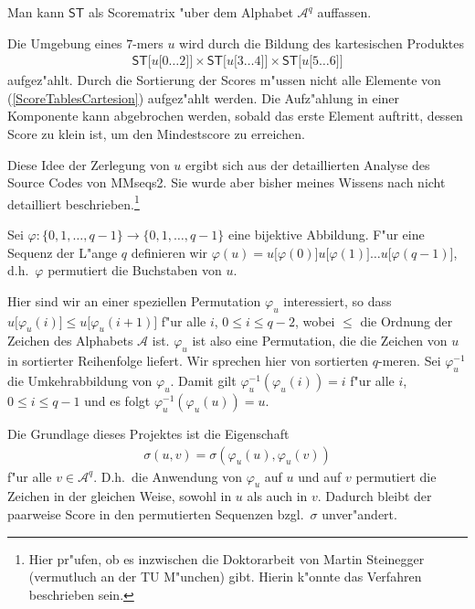 \documentclass[12pt,a4paper]{scrartcl}
\newcommand{\Substring}[3]{#1\lbrack #2\ldots#3\rbrack}
\newcommand{\Subchar}[2]{#1\lbrack #2\rbrack}
\newcommand{\Scoretablename}[0]{\mathsf{ST}}
\newcommand{\Scoretable}[1]{\Scoretablename\lbrack #1\rbrack}
\newcommand{\Permname}[1]{\varphi_{#1}}
\newcommand{\Perm}[2]{\Permname{#1}(#2)}
\newcommand{\Permnameinverse}[1]{\varphi_{#1}^{-1}}
\newcommand{\Perminverse}[2]{\Permnameinverse{#1}(#2)}
\newcommand{\Alpha}[0]{\mathcal{A}}
\begin{document}
Man kann \(\Scoretablename\) als Scorematrix "uber dem Alphabet \(\Alpha^{q}\)
auffassen.

Die Umgebung eines \(7\)-mers \(u\) wird durch die Bildung
des kartesischen Produktes
\begin{align}
\Scoretable{\Substring{u}{0}{2}}\times \Scoretable{\Substring{u}{3}{4}}\times
\Scoretable{\Substring{u}{5}{6}}\label{ScoreTablesCartesian}
\end{align}
aufgez"ahlt. Durch die Sortierung
der Scores m"ussen nicht alle Elemente von
(\ref{ScoreTablesCartesion})
aufgez"ahlt werden.
Die Aufz"ahlung in einer Komponente kann abgebrochen werden,
sobald das erste Element auftritt, dessen Score zu klein ist, um den
Mindestscore zu erreichen.

Diese Idee der Zerlegung von \(u\) ergibt sich aus
der detaillierten Analyse des Source Codes von MMseqs2. Sie wurde aber bisher
meines Wissens nach nicht detailliert beschrieben.\footnote{Hier pr"ufen, ob
es inzwischen die Doktorarbeit von Martin Steinegger (vermutluch an der
TU M"unchen) gibt. Hierin k"onnte das Verfahren beschrieben sein.}

Sei \(\varphi:\{0,1,\ldots,q-1\}\to \{0,1,\ldots,q-1\}\) eine bijektive
Abbildung. F"ur eine Sequenz der L"ange \(q\) definieren wir
\(\varphi(u)=\Subchar{u}{\varphi(0)}\Subchar{u}{\varphi(1)}\ldots\Subchar{u}{\varphi(q-1)}\), d.h.\ \(\varphi\) permutiert die Buchstaben von \(u\).

Hier sind wir an einer speziellen Permutation \(\Permname{u}\) interessiert,
so dass \(\Subchar{u}{\Perm{u}{i}}\leq\Subchar{u}{\Perm{u}{i+1}}\)
f"ur alle \(i\), \(0\leq i\leq q-2\), wobei \(\leq\) die Ordnung der Zeichen
des Alphabets \(\Alpha\) ist. \(\Permname{u}\) ist also eine Permutation, die
die Zeichen von \(u\) in sortierter Reihenfolge liefert. Wir sprechen hier
von sortierten \(q\)-meren.
Sei \(\Permnameinverse{u}\) die Umkehrabbildung von
\(\Permname{u}\). Damit gilt \(\Perminverse{u}{\Perm{u}{i}}=i\) f"ur alle \(i\), \(0\leq i\leq q-1\) und es
folgt \(\Perminverse{u}{\Perm{u}{u}}=u\).

Die Grundlage dieses Projektes ist die Eigenschaft
\begin{align}
\sigma(u,v)=\sigma(\Perm{u}{u},\Perm{u}{v})
\end{align}
f"ur alle \(v\in\Alpha^{q}\).
D.h.\ die Anwendung von \(\Permname{u}\) auf \(u\) und auf \(v\)
permutiert die Zeichen in der gleichen Weise, sowohl in \(u\) als auch
in \(v\). Dadurch bleibt der paarweise Score in den permutierten
Sequenzen bzgl.\ \(\sigma\) unver"andert.
\end{document}
